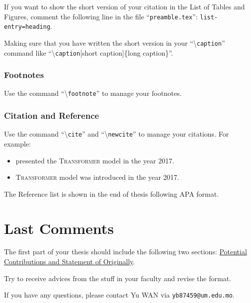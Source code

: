 If you want to show the short version of your citation in the List of Tables and Figures, comment the following line in the file ``\texttt{preamble.tex}'':
{\texttt{list-entry=heading}}.

Making sure that you have written the short version in your ``{\textbackslash\texttt{caption}}'' command like ``\textbackslash\texttt{caption}{[short caption]}{\{long caption\}}''.

\subsubsection{Footnotes}
Use the command ``\textbackslash\texttt{footnote}'' to manage your footnotes.

\subsubsection{Citation and Reference}
Use the command ``\textbackslash\texttt{cite}'' and ``\textbackslash\texttt{newcite}'' to manage your citations.
For example:

\begin{itemize}
    \item {} presented the \textsc{Transformer} model in the year 2017.
    \item \textsc{Transformer} model \cite{vaswani2017attention} was introduced in the year 2017.
\end{itemize}

The Reference list is shown in the end of thesis following APA format.

\section{Last Comments}
The first part of your thesis should include the following two sections: \uline{Potential Contributions and Statement of Originally}.

Try to receive advices from the stuff in your faculty and revise the format.

If you have any questions, please contact Yu WAN via \texttt{yb87459@um.edu.mo}.

